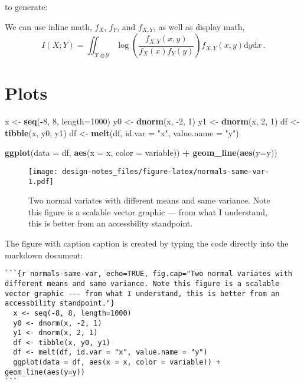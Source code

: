 \documentclass[
]{book}
\newenvironment{Shaded}{\begin{snugshade}}{\end{snugshade}}
\newcommand{\DataTypeTok}[1]{\textcolor[rgb]{0.13,0.29,0.53}{#1}}
\newcommand{\DecValTok}[1]{\textcolor[rgb]{0.00,0.00,0.81}{#1}}
\newcommand{\KeywordTok}[1]{\textcolor[rgb]{0.13,0.29,0.53}{\textbf{#1}}}
\newcommand{\NormalTok}[1]{#1}
\newcommand{\OperatorTok}[1]{\textcolor[rgb]{0.81,0.36,0.00}{\textbf{#1}}}
\newcommand{\StringTok}[1]{\textcolor[rgb]{0.31,0.60,0.02}{#1}}
\begin{document}
to generate:

We can use inline math, \(f_X\), \(f_Y\), and \(f_{X,Y}\), as well as display math,
\[
  I(X;Y)
  = \iint_{\mathcal{X} \otimes \mathcal{Y}}
  \log\left( \frac{f_{X,Y}(x,y)}{f_{X}(x)f_{Y}(y)} \right)
  f_{X,Y}(x,y) \mathrm{d}y \mathrm{d}x\,.
\]

\hypertarget{plots}{%
\section*{Plots}\label{plots}}

\begin{Shaded}
\begin{Highlighting}[]
\NormalTok{x \textless{}{-}}\StringTok{ }\KeywordTok{seq}\NormalTok{(}\OperatorTok{{-}}\DecValTok{8}\NormalTok{, }\DecValTok{8}\NormalTok{, }\DataTypeTok{length=}\DecValTok{1000}\NormalTok{)}
\NormalTok{y0 \textless{}{-}}\StringTok{ }\KeywordTok{dnorm}\NormalTok{(x, }\DecValTok{{-}2}\NormalTok{, }\DecValTok{1}\NormalTok{)}
\NormalTok{y1 \textless{}{-}}\StringTok{ }\KeywordTok{dnorm}\NormalTok{(x, }\DecValTok{2}\NormalTok{, }\DecValTok{1}\NormalTok{)}
\NormalTok{df \textless{}{-}}\StringTok{ }\KeywordTok{tibble}\NormalTok{(x, y0, y1)}
\NormalTok{df \textless{}{-}}\StringTok{ }\KeywordTok{melt}\NormalTok{(df, }\DataTypeTok{id.var =} \StringTok{"x"}\NormalTok{, }\DataTypeTok{value.name =} \StringTok{"y"}\NormalTok{)}

\KeywordTok{ggplot}\NormalTok{(}\DataTypeTok{data =}\NormalTok{ df, }\KeywordTok{aes}\NormalTok{(}\DataTypeTok{x =}\NormalTok{ x, }\DataTypeTok{color =}\NormalTok{ variable)) }\OperatorTok{+}\StringTok{ }\KeywordTok{geom\_line}\NormalTok{(}\KeywordTok{aes}\NormalTok{(}\DataTypeTok{y=}\NormalTok{y)) }
\end{Highlighting}
\end{Shaded}

\begin{figure}
\centering
\texttt{[image: design-notes\_files/figure-latex/normals-same-var-1.pdf]}
\caption{\label{fig:normals-same-var}Two normal variates with different means and same variance. Note this figure is a scalable vector graphic --- from what I understand, this is better from an accessbility standpoint.}
\end{figure}

The figure with caption caption is created by typing the code directly into the markdown document:

\begin{verbatim}
```{r normals-same-var, echo=TRUE, fig.cap="Two normal variates with different means and same variance. Note this figure is a scalable vector graphic --- from what I understand, this is better from an accessbility standpoint."}
  x <- seq(-8, 8, length=1000)
  y0 <- dnorm(x, -2, 1)
  y1 <- dnorm(x, 2, 1)
  df <- tibble(x, y0, y1)
  df <- melt(df, id.var = "x", value.name = "y")
  ggplot(data = df, aes(x = x, color = variable)) + geom_line(aes(y=y)) 
```
\end{verbatim}
\end{document}
